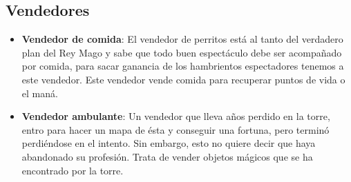 \subsection{Vendedores}


\begin{itemize}
    \item \textbf{Vendedor de comida}: El vendedor de perritos está al tanto
    del verdadero plan del Rey Mago y sabe que todo buen espectáculo debe ser
    acompañado por comida, para sacar ganancia de los hambrientos espectadores
    tenemos a este vendedor. Este vendedor vende comida para recuperar puntos de
    vida o el maná.

    \item \textbf{Vendedor ambulante}: Un vendedor que lleva años perdido en la
    torre, entro para hacer un mapa de ésta y conseguir una fortuna, pero
    terminó perdiéndose en el intento. Sin embargo, esto no quiere decir que haya
    abandonado su profesión. Trata de vender objetos mágicos que se ha
    encontrado por la torre.

\end{itemize}